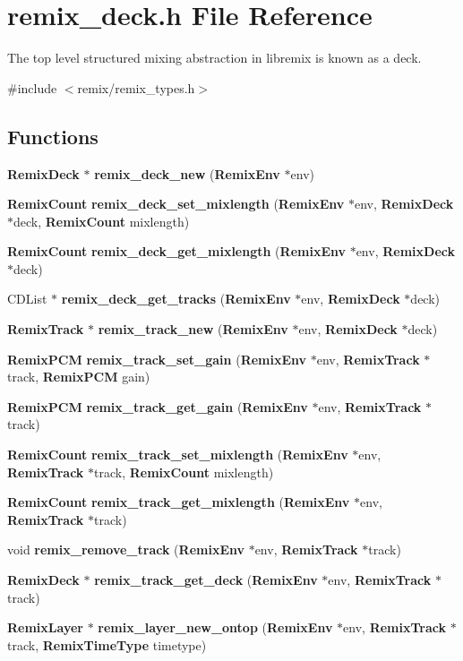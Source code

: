\section{remix\_\-deck.h File Reference}
\label{remix__deck_8h}


The top level structured mixing abstraction in libremix is known as a deck.  


{\ttfamily \#include $<$remix/remix\_\-types.h$>$}\par
\subsection*{Functions}
\begin{DoxyCompactItemize}
\item 
{\bf RemixDeck} $\ast$ {\bf remix\_\-deck\_\-new} ({\bf RemixEnv} $\ast$env)
\item 
{\bf RemixCount} {\bf remix\_\-deck\_\-set\_\-mixlength} ({\bf RemixEnv} $\ast$env, {\bf RemixDeck} $\ast$deck, {\bf RemixCount} mixlength)
\item 
{\bf RemixCount} {\bf remix\_\-deck\_\-get\_\-mixlength} ({\bf RemixEnv} $\ast$env, {\bf RemixDeck} $\ast$deck)
\item 
CDList $\ast$ {\bf remix\_\-deck\_\-get\_\-tracks} ({\bf RemixEnv} $\ast$env, {\bf RemixDeck} $\ast$deck)
\item 
{\bf RemixTrack} $\ast$ {\bf remix\_\-track\_\-new} ({\bf RemixEnv} $\ast$env, {\bf RemixDeck} $\ast$deck)
\item 
{\bf RemixPCM} {\bf remix\_\-track\_\-set\_\-gain} ({\bf RemixEnv} $\ast$env, {\bf RemixTrack} $\ast$track, {\bf RemixPCM} gain)
\item 
{\bf RemixPCM} {\bf remix\_\-track\_\-get\_\-gain} ({\bf RemixEnv} $\ast$env, {\bf RemixTrack} $\ast$track)
\item 
{\bf RemixCount} {\bf remix\_\-track\_\-set\_\-mixlength} ({\bf RemixEnv} $\ast$env, {\bf RemixTrack} $\ast$track, {\bf RemixCount} mixlength)
\item 
{\bf RemixCount} {\bf remix\_\-track\_\-get\_\-mixlength} ({\bf RemixEnv} $\ast$env, {\bf RemixTrack} $\ast$track)
\item 
void {\bf remix\_\-remove\_\-track} ({\bf RemixEnv} $\ast$env, {\bf RemixTrack} $\ast$track)
\item 
{\bf RemixDeck} $\ast$ {\bf remix\_\-track\_\-get\_\-deck} ({\bf RemixEnv} $\ast$env, {\bf RemixTrack} $\ast$track)
\item 
{\bf RemixLayer} $\ast$ {\bf remix\_\-layer\_\-new\_\-ontop} ({\bf RemixEnv} $\ast$env, {\bf RemixTrack} $\ast$track, {\bf RemixTimeType} timetype)

\end{DoxyCompactItemize}
